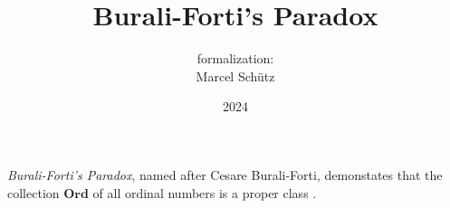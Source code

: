 \documentclass{article}
\title{Burali-Forti's Paradox}
\author{\Naproche formalization:\\[0.5em]Marcel Schütz}
\date{2024}
\newcommand\Ord{\textbf{Ord}}
\begin{document}
  \maketitle
  
  \noindent \emph{Burali-Forti's Paradox}, named after Cesare Burali-Forti, 
  demonstates that the collection $\Ord$ of all ordinal numbers is a
  proper class \cite{BuraliForti1897}.


  \printbibliography
\end{document}
